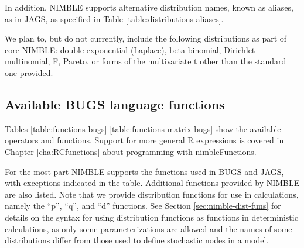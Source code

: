 \documentclass[12pt,oneside]{book}\usepackage[]{graphicx}\usepackage[]{color}
\def\cd#1{\texttt{#1}}
\begin{document}

In addition, NIMBLE supports alternative distribution names, known as aliases, as in JAGS, as specified in Table \ref{table:distributions-aliases}. 





We plan to, but do not currently, include the following distributions as part of core NIMBLE: double exponential (Laplace), beta-binomial, Dirichlet-multinomial, F, Pareto, or forms of the multivariate t other than the standard one provided. 



\subsection{Available BUGS language functions}
\label{subsec:BUGS-lang-fxns}

Tables \ref{table:functions-bugs}-\ref{table:functions-matrix-bugs} show the
available operators and functions. 
Support for more general R expressions
is covered in Chapter \ref{cha:RCfunctions} about programming
with nimbleFunctions. 

For the most part NIMBLE supports the functions used in BUGS and JAGS,
with exceptions indicated in the table.  Additional functions provided
by NIMBLE are also listed. Note that we provide distribution functions
for use in calculations, namely the ``p'', ``q'', and ``d'' functions.
 See Section \ref{sec:nimble-dist-funs} for details on the syntax for using distribution functions as functions in deterministic calculations, as only some parameterizations are allowed and the names of some distributions differ from those used to define stochastic nodes in a model. 
\end{document}
